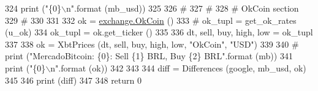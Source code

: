 \begin{DoxyCode}
324     \textcolor{keywordflow}{print} (\textcolor{stringliteral}{"\{0\}\(\backslash\)n"}.format (mb\_usd))
325     
326     \textcolor{comment}{#}
327     \textcolor{comment}{#}
328     \textcolor{comment}{# OkCoin section }
329     \textcolor{comment}{# }
330     
331 
332     ok = \hyperlink{classexchange_1_1_ok_coin}{exchange.OkCoin} ()        
333 \textcolor{comment}{#    ok\_tupl = get\_ok\_rates (u\_ok)}
334     ok\_tupl = ok.get\_ticker ()
335     
336     dt, sell, buy, high, low = ok\_tupl
337     
338     ok = XbtPrices (dt, sell, buy, high, low, \textcolor{stringliteral}{"OkCoin"}, \textcolor{stringliteral}{"USD"})
339     
340     \textcolor{comment}{# print ("MercadoBitcoin: \{0\}: Sell \{1\} BRL, Buy \{2\} BRL".format (mb))}
341     \textcolor{keywordflow}{print} (\textcolor{stringliteral}{"\{0\}\(\backslash\)n"}.format (ok))
342      
343     
344     diff = Differences (google, mb\_usd, ok)
345     
346     \textcolor{keywordflow}{print} (diff)
347     
348     \textcolor{keywordflow}{return} 0
    
\end{DoxyCode}

